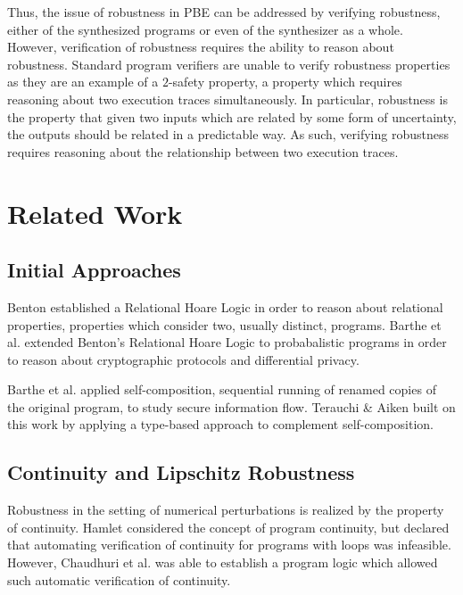 \documentclass{llncs}
\begin{document}
Thus, the issue of robustness in PBE can be addressed by verifying robustness,
either of the synthesized programs or even of the synthesizer as a whole.
However, verification of robustness requires the ability to reason about
robustness.  Standard program verifiers are unable to verify robustness
properties as they are an example of a \(2\)-safety property, a property which
requires reasoning about two execution traces simultaneously.  In particular,
robustness is the property that given two inputs which are related by some form
of uncertainty, the outputs should be related in a predictable way.  As such,
verifying robustness requires reasoning about the relationship between two
execution traces.

\section{Related Work}

  \subsection{Initial Approaches}
    \space\space Benton \cite{benton} established a
    Relational Hoare Logic in order to reason about relational properties,
    properties which consider two, usually distinct, programs.  Barthe et al.
    \cite{barthecrypto,bartheprivacy} extended Benton's Relational Hoare Logic to
    probabalistic programs in order to reason about cryptographic protocols and
    differential privacy.
    \smallskip

    \space\space Barthe et al.
    \cite{barthecomposition} applied self-composition, sequential running of renamed
    copies of the original program, to study secure information flow.  Terauchi \&
    Aiken \cite{terauchi05} built on this work by applying a type-based approach to
    complement self-composition.

  \subsection{Continuity and Lipschitz Robustness}
    \space\space Robustness in the setting of numerical perturbations
    is realized by the property of continuity.  Hamlet \cite{hamlet02} considered the
    concept of program continuity, but declared that automating verification of
    continuity for programs with loops was infeasible.  However, Chaudhuri et al.
    \cite{chaudhuri10} was able to establish a program logic which allowed such
    automatic verification of continuity.
    \smallskip
\end{document}
